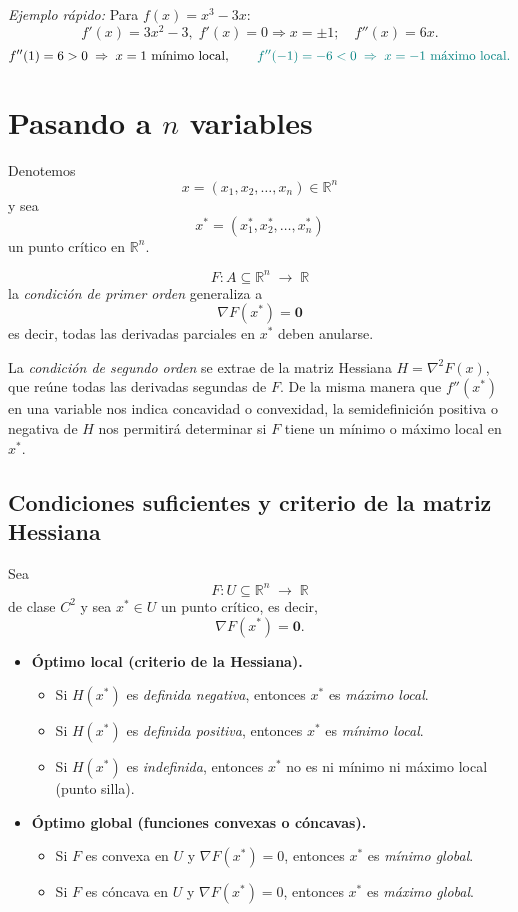 \documentclass{article}
\begin{document}
\medskip

\noindent\emph{Ejemplo rápido:}  
Para \(f(x)=x^3-3x\):
\[
f'(x)=3x^2-3,\;f'(x)=0\Rightarrow x=\pm1;
\quad
f''(x)=6x.
\]
\[
f''(1)=6>0\;\Rightarrow\;x=1\text{ mínimo local},\qquad
\color{teal} f''(-1)=-6<0\;\Rightarrow\;x=-1\text{ máximo local}.
\]

\section*{Pasando a \(n\) variables}

Denotemos 
\[
x = (x_{1}, x_{2}, \dots, x_{n}) \in \mathbb{R}^n
\]
y sea 
\[
x^* = (x^*_{1}, x^*_{2}, \dots, x^*_{n})
\]
un punto crítico en \(\mathbb{R}^n\).

\[
F\colon A\subseteq\mathbb{R}^n\;\to\;\mathbb{R}
\]
la \emph{condición de primer orden} generaliza a  
\[
\nabla F(x^*) = \mathbf{0}
\]
es decir, todas las derivadas parciales en \(x^*\) deben anularse.  

La \emph{condición de segundo orden} se extrae de la matriz Hessiana  
\(H=\nabla^2 F(x)\), que reúne todas las derivadas segundas de \(F\).  
De la misma manera que \(f''(x^*)\) en una variable nos indica concavidad o convexidad,  
la semidefinición positiva o negativa de  $H$ nos permitirá determinar si \(F\) tiene un mínimo o máximo local en \(x^*\).


\subsection*{Condiciones suficientes y criterio de la matriz Hessiana}

Sea 
\[
F\colon U\subseteq\mathbb{R}^n\;\longrightarrow\;\mathbb{R}
\]
de clase \(C^2\) y sea \(x^*\in U\) un punto crítico, es decir,
\[
\nabla F(x^*) = \mathbf{0}.
\]

\begin{itemize}

  \item \textbf{Óptimo local (criterio de la Hessiana).}
    \begin{itemize} \color{teal}
      \item \color{teal}Si \(H(x^*)\) es \emph{definida negativa}, entonces \(x^*\) es \emph{máximo local}.
      \item Si \(H(x^*)\) es \emph{definida positiva}, entonces \(x^*\) es \emph{mínimo local}.
      \item Si \(H(x^*)\) es \emph{indefinida}, entonces \(x^*\) no es ni mínimo ni máximo local (punto silla).
    \end{itemize}
      \item \textbf{Óptimo global (funciones convexas o cóncavas).}
    \begin{itemize}
      \item \color{teal} Si \(F\) es convexa en \(U\) y \(\nabla F(x^*)=0\), entonces \(x^*\) es \emph{mínimo global}.
      \item Si \(F\) es cóncava en \(U\) y \(\nabla F(x^*)=0\), entonces \(x^*\) es \emph{máximo global}.
    \end{itemize}
\end{itemize}
\end{document}
